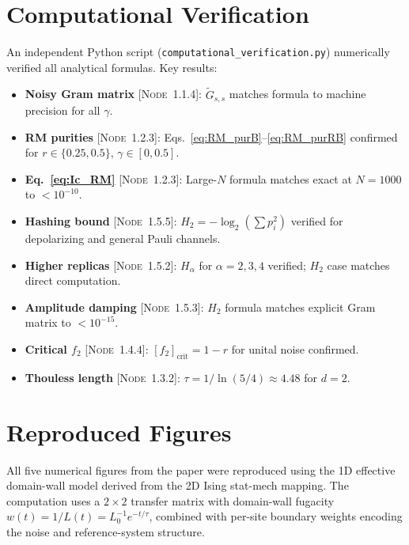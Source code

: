 \documentclass[11pt,a4paper]{article}
\newcommand{\noderef}[1]{\textsc{[Node~#1]}}
\begin{document}
\section{Computational Verification}
\label{sec:computational}

An independent Python script (\texttt{computational\_verification.py}) numerically verified all analytical formulas. Key results:

\begin{itemize}[nosep]
    \item \textbf{Noisy Gram matrix} \noderef{1.1.4}: $\tilde{G}_{s,s}$ matches formula to machine precision for all $\gamma$.
    \item \textbf{RM purities} \noderef{1.2.3}: Eqs.~\eqref{eq:RM_purB}--\eqref{eq:RM_purRB} confirmed for $r \in \{0.25, 0.5\}$, $\gamma \in [0, 0.5]$.
    \item \textbf{Eq.~\eqref{eq:Ic_RM}} \noderef{1.2.3}: Large-$N$ formula matches exact at $N=1000$ to $< 10^{-10}$.
    \item \textbf{Hashing bound} \noderef{1.5.5}: $H_2 = -\log_2(\sum p_i^2)$ verified for depolarizing and general Pauli channels.
    \item \textbf{Higher replicas} \noderef{1.5.2}: $H_\alpha$ for $\alpha=2,3,4$ verified; $H_2$ case matches direct computation.
    \item \textbf{Amplitude damping} \noderef{1.5.3}: $H_2$ formula matches explicit Gram matrix to $< 10^{-15}$.
    \item \textbf{Critical $f_2$} \noderef{1.4.4}: $[f_2]_{\mathrm{crit}} = 1-r$ for unital noise confirmed.
    \item \textbf{Thouless length} \noderef{1.3.2}: $\tau = 1/\ln(5/4) \approx 4.48$ for $d=2$.
\end{itemize}

\section{Reproduced Figures}
\label{sec:figures}

All five numerical figures from the paper were reproduced using the 1D effective domain-wall model derived from the 2D Ising stat-mech mapping. The computation uses a $2\times 2$ transfer matrix with domain-wall fugacity $w(t) = 1/L(t) = L_0^{-1} e^{-t/\tau}$, combined with per-site boundary weights encoding the noise and reference-system structure.
\end{document}
